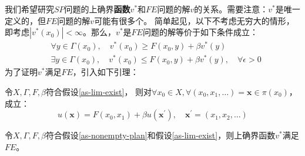 我们希望研究$SP$问题的上确界\textbf{函数}$v^*$和$FE$问题的解$v$的关系。需要注意：$v^*$是唯一定义的，但$FE$问题的解$v$可能有很多个。
简单起见，以下不考虑无穷大的情形，即考虑$\left|v^*\left(x_0\right)\right| < \infty$。那么，$v^*$是$FE$问题的解等价于如下条件成立：
$$
\begin{aligned}
    &\forall y \in \Gamma\left(x_0\right),\quad v^*\left(x_0\right)\geq F\left(x_0,y\right) + \beta v^*\left(y\right)\\
    &\exists y\in \Gamma\left(x_0\right),\quad v^*\left(x_0\right)\leq F\left(x_0,y\right) + \beta v^*\left(y\right), \quad \forall \epsilon > 0
\end{aligned}
$$
为了证明$v^*$满足$FE$，引入如下引理：
\begin{lemma}
    令$X, \Gamma, F, \beta$符合假设\ref{as-lim-exist}，
    则对$\forall x_0 \in X, \forall \left(x_0,x_1,\dots\right)=\boldsymbol{x}\in\pi\left(x_0\right)$，成立：
    \begin{equation*}
        u\left(\boldsymbol{x}\right)=
            F\left(x_0,x_1\right)+\beta u\left(\boldsymbol{x}^{\prime}\right), \quad \boldsymbol{x}^{\prime}=\left(x_1,x_2,\dots\right)
    \end{equation*}
\end{lemma}
\begin{theorem}[SP-FE] \label{th-solution-sp-fe}
    令$X, \Gamma, F, \beta$符合假设\ref{as-nonempty-plan}和假设\ref{as-lim-exist}，则上确界函数$v^*$满足$FE$。
\end{theorem}
